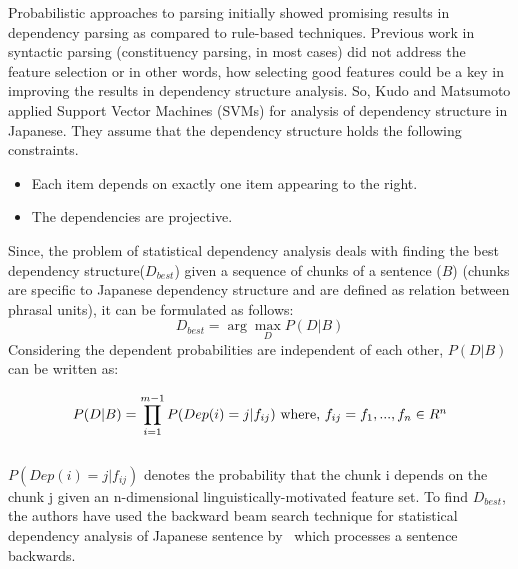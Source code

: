 Probabilistic approaches to parsing initially showed promising results in dependency parsing as compared to rule-based techniques. 
Previous work in syntactic parsing (constituency parsing, in most cases) did not address the feature selection or in other words, how selecting good features could be a key in improving the results in dependency structure analysis.
So, Kudo and Matsumoto\cite{Kudo:2000:JDS:1117794.1117797} applied Support Vector Machines (SVMs) for analysis of dependency structure in Japanese. They assume that the dependency structure holds the following constraints.
\begin{itemize}[leftmargin=*]
\itemsep-0.5em
    \item Each item depends on exactly one item appearing to the right.
    \item The dependencies are projective.
\end{itemize}
Since, the problem of statistical dependency analysis deals with finding the best dependency structure($D_{best}$) given a sequence of chunks of a sentence ($B$) (chunks are specific to Japanese dependency structure and are defined as relation between phrasal units), it can be formulated as follows:
\begin{equation*}
    D_{best} = \arg\max_{D} P(D|B)
\end{equation*}
Considering the dependent probabilities are independent of each other, $P(D|B)$ can be written as:

\begin{equation}
P(D|B) = \prod_{i=1}^{m-1}P(Dep(i)=j|f_{ij}) 
$ where, $ 
f_{ij} = {f_1,...,f_n} \in R^n 
\end{equation} \\
$P(Dep(i)=j|f_{ij})$ denotes the probability that the chunk i depends on the chunk j given an n-dimensional linguistically-motivated feature set. 
To find $D_{best}$, the authors have used the backward beam search technique for statistical dependency analysis of Japanese sentence by~\cite{Sekine:2000:BBS:992730.992755} which processes a sentence backwards.

